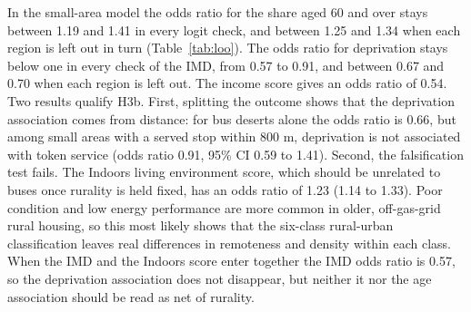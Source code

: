 \documentclass[11pt,a4paper]{article}
\begin{document}
In the small-area model the odds ratio for the share aged 60 and over stays between 1.19 and 1.41 in every logit check, and between 1.25 and 1.34 when each region is left out in turn (Table~\ref{tab:loo}). The odds ratio for deprivation stays below one in every check of the IMD, from 0.57 to 0.91, and between 0.67 and 0.70 when each region is left out. The income score gives an odds ratio of 0.54. Two results qualify H3b. First, splitting the outcome shows that the deprivation association comes from distance: for bus deserts alone the odds ratio is 0.66, but among small areas with a served stop within 800 m, deprivation is not associated with token service (odds ratio 0.91, 95\% CI 0.59 to 1.41). Second, the falsification test fails. The Indoors living environment score, which should be unrelated to buses once rurality is held fixed, has an odds ratio of 1.23 (1.14 to 1.33). Poor condition and low energy performance are more common in older, off-gas-grid rural housing, so this most likely shows that the six-class rural-urban classification leaves real differences in remoteness and density within each class. When the IMD and the Indoors score enter together the IMD odds ratio is 0.57, so the deprivation association does not disappear, but neither it nor the age association should be read as net of rurality.
\end{document}

